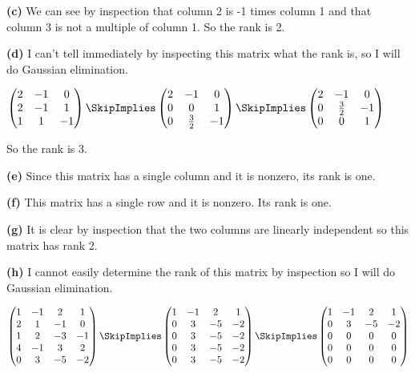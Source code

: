 \documentclass[oneside,12pt]{amsart}
\begin{document}
\textbf{(c)} We can see by inspection that column 2 is -1 times column 1 and that column 3 is not a multiple of column 1. So the rank is 2.

\bigskip

\textbf{(d)} I can't tell immediately by inspecting this matrix what the rank is, so I will do Gaussian elimination.

$
\begin{pmatrix}
2 & -1 & 0 \\
2 & -1 & 1 \\
1 & 1 & -1
\end{pmatrix}
\SkipImplies
\begin{pmatrix}
2 & -1 & 0 \\
0 & 0 & 1 \\
0 & \frac{3}{2} & -1
\end{pmatrix}
\SkipImplies
\begin{pmatrix}
2 & -1 & 0 \\
0 & \frac{3}{2} & -1 \\
0 & 0 & 1 \\
\end{pmatrix}
$

\bigskip

So the rank is 3.

\bigskip

\textbf{(e)} Since this matrix has a single column and it is nonzero, its rank is one.

\bigskip

\textbf{(f)} This matrix has a single row and it is nonzero. Its rank is one.

\bigskip

\textbf{(g)} It is clear by inspection that the two columns are linearly independent
so this matrix has rank 2.

\bigskip

\textbf{(h)} I cannot easily determine the rank of this matrix by inspection so I will do Gaussian elimination.

\bigskip

$
\begin{pmatrix}
1 & -1 & 2 & 1 \\
2 & 1 & -1 & 0 \\
1 & 2 & -3 & -1 \\
4 & -1 & 3 & 2 \\
0 & 3 & -5 & -2
\end{pmatrix}
\SkipImplies
\begin{pmatrix}
1 & -1 & 2 & 1 \\
0 & 3 & -5 & -2 \\
0 & 3 & -5 & -2 \\
0 & 3 & -5 & -2 \\
0 & 3 & -5 & -2
\end{pmatrix}
\SkipImplies
\begin{pmatrix}
1 & -1 & 2 & 1 \\
0 & 3 & -5 & -2 \\
0 & 0 & 0 & 0 \\
0 & 0 & 0 & 0 \\
0 & 0 & 0 & 0
\end{pmatrix}
$
\end{document}
